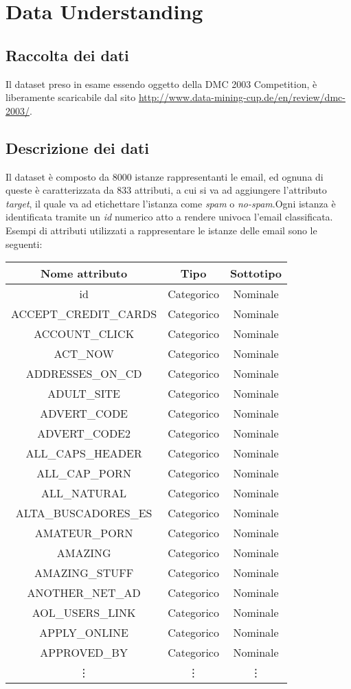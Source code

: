 \chapter{Data Understanding}
\section{Raccolta dei dati}
Il dataset preso in esame essendo oggetto della DMC 2003 Competition, è liberamente scaricabile dal sito \url{http://www.data-mining-cup.de/en/review/dmc-2003/}.
\section{Descrizione dei dati}
Il dataset è composto da 8000 istanze rappresentanti le email, ed ognuna di queste è caratterizzata da 833 attributi, a cui si va ad aggiungere l'attributo \textit{target}, il quale va ad etichettare l'istanza come \textit{spam} o \textit{no-spam}.Ogni istanza è identificata tramite un \textit{id} numerico atto a rendere univoca l'email classificata. Esempi di attributi utilizzati a rappresentare le istanze delle email sono le seguenti:


\begin{tabular}{ c | c | c}
	\textbf{Nome attributo} & \textbf{Tipo} & \textbf{Sottotipo} \\
	\hline
	id & Categorico & Nominale \\ 
	ACCEPT\_CREDIT\_CARDS & Categorico & Nominale \\ 
	ACCOUNT\_CLICK & Categorico & Nominale \\ 
	ACT\_NOW & Categorico & Nominale \\ 
	ADDRESSES\_ON\_CD & Categorico & Nominale \\ 
	ADULT\_SITE & Categorico & Nominale \\ 
	ADVERT\_CODE & Categorico & Nominale \\ 
	ADVERT\_CODE2 & Categorico & Nominale \\ 
	ALL\_CAPS\_HEADER & Categorico & Nominale \\ 
	ALL\_CAP\_PORN & Categorico & Nominale \\ 
	ALL\_NATURAL & Categorico & Nominale \\ 
	ALTA\_BUSCADORES\_ES & Categorico & Nominale \\ 
	AMATEUR\_PORN & Categorico & Nominale \\ 
	AMAZING & Categorico & Nominale \\ 
	AMAZING\_STUFF & Categorico & Nominale \\ 
	ANOTHER\_NET\_AD & Categorico & Nominale \\ 
	AOL\_USERS\_LINK & Categorico & Nominale \\ 
	APPLY\_ONLINE & Categorico & Nominale \\ 
	APPROVED\_BY & Categorico & Nominale \\ 
	\vdots  &  \vdots  &  \vdots  \\
	\end{tabular}


